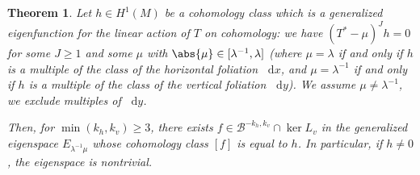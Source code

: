 \documentclass[10pt]{amsart}
\newcommand{\boB}{\mathcal{B}}
\newcommand{\dd}{\mathop{}\!\mathrm{d}}
\newtheorem{thm}{Theorem}[section]
\theoremstyle{definition}
\numberwithin{equation}{section}
\begin{document}
\begin{thm}
\label{thm:realise_H1} Let $h \in H^1(M)$ be a cohomology class which is a
generalized eigenfunction for the linear action of $T$ on cohomology: we have
$(T^* - \mu)^J h = 0$ for some $J\geq 1$ and some $\mu$ with $\abs{\mu}\in
[\lambda^{-1}, \lambda]$ (where $\mu = \lambda$ if and only if $h$ is a
multiple of the class of the horizontal foliation $\dd x$, and $\mu =
\lambda^{-1}$ if and only if $h$ is a multiple of the class of the vertical
foliation $\dd y$). We assume $\mu \neq \lambda^{-1}$, \ie we exclude
multiples of $\dd y$.

Then, for $\min(k_h, k_v) \geq 3$, there exists $f \in \boB^{-k_h, k_v} \cap
\ker L_v$ in the generalized eigenspace $E_{\lambda^{-1} \mu}$ whose
cohomology class $[f]$ is equal to $h$. In particular, if $h \neq 0$, the
eigenspace is nontrivial.
\end{thm}
\end{document}
